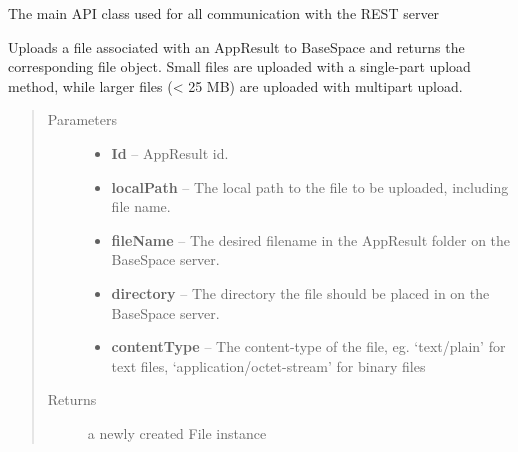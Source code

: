 \documentclass[letterpaper,10pt,english]{sphinxmanual}
\begin{document}
\begin{fulllineitems}
\label{Available modules:BaseSpacePy.api.BaseSpaceAPI.BaseSpaceAPI}
The main API class used for all communication with the REST server

\begin{fulllineitems}
\label{Available modules:BaseSpacePy.api.BaseSpaceAPI.BaseSpaceAPI.appResultFileUpload}
Uploads a file associated with an AppResult to BaseSpace and returns the corresponding file object.
Small files are uploaded with a single-part upload method, while larger files (\textless{} 25 MB) are uploaded
with multipart upload.
\begin{quote}\begin{description}
\item[{Parameters}] \leavevmode\begin{itemize}
\item {} 
\textbf{Id} -- AppResult id.

\item {} 
\textbf{localPath} -- The local path to the file to be uploaded, including file name.

\item {} 
\textbf{fileName} -- The desired filename in the AppResult folder on the BaseSpace server.

\item {} 
\textbf{directory} -- The directory the file should be placed in on the BaseSpace server.

\item {} 
\textbf{contentType} -- The content-type of the file, eg. `text/plain' for text files, `application/octet-stream' for binary files

\end{itemize}

\item[{Returns}] \leavevmode
a newly created File instance

\end{description}\end{quote}


\end{fulllineitems}
\end{fulllineitems}
\end{document}
